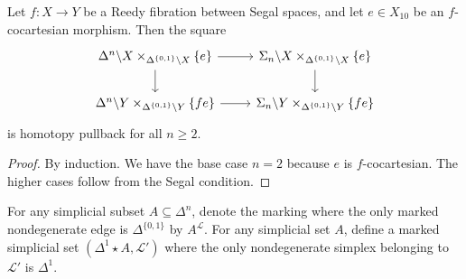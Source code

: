 \documentclass[main.tex]{subfiles}
\begin{document}
\begin{proposition}
  Let $f\colon X \to Y$ be a Reedy fibration between Segal spaces, and let $e \in X_{10}$ be an $f$-cocartesian morphism. Then the square
  \begin{equation*}
    \begin{tikzcd}
      \Delta^{n} \backslash X \times_{\Delta^{\{0, 1\}} \backslash X} \{e\}
      \arrow[r]
      \arrow[d]
      & \Sigma_{n} \backslash X \times_{\Delta^{\{0, 1\}} \backslash X} \{e\}
      \arrow[d]
      \\
      \Delta^{n} \backslash Y \times_{\Delta^{\{0, 1\}} \backslash Y} \{fe\}
      \arrow[r]
      & \Sigma_{n} \backslash Y \times_{\Delta^{\{0, 1\}} \backslash Y} \{fe\}
    \end{tikzcd}
  \end{equation*}
  is homotopy pullback for all $n \geq 2$.
\end{proposition}
\begin{proof}
  By induction. We have the base case $n = 2$ because $e$ is $f$-cocartesian. The higher cases follow from the Segal condition.

\end{proof}

For any simplicial subset $A \subseteq \Delta^{n}$, denote the marking where the only marked nondegenerate edge is $\Delta^{\{0, 1\}}$ by $A^{\mathcal{L}}$. For any simplicial set $A$, define a marked simplicial set $(\Delta^{1} \star A, \mathcal{L'})$ where the only nondegenerate simplex belonging to $\mathcal{L'}$ is $\Delta^{1}$.
\end{document}
